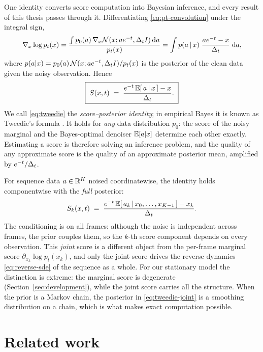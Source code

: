 One identity converts score computation into Bayesian inference, and every
result of this thesis passes through it. Differentiating
\eqref{eq:pt-convolution} under the integral sign,
\begin{equation*}
  \nabla_x \log p_t(x)
  = \frac{\int p_0(a)\, \nabla_x \mathcal{N}(x; a e^{-t}, \Delta_t I)\, \mathrm{d} a}{p_t(x)}
  = \int p(a \,|\, x)\;
    \frac{a e^{-t} - x}{\Delta_t}\; \mathrm{d} a ,
\end{equation*}
where $p(a|x) = p_0(a)\,\mathcal{N}(x; ae^{-t}, \Delta_t I)/p_t(x)$ is the posterior
of the clean data given the noisy observation. Hence
\begin{equation}
  \boxed{\;
  S(x, t)
  \;=\; \frac{e^{-t}\,\mathbb{E}[\,a \,|\, x\,] - x}{\Delta_t} .
  \;}
  \label{eq:tweedie}
\end{equation}
We call \eqref{eq:tweedie} the \emph{score--posterior identity}; in
empirical Bayes it is known as Tweedie's formula
\citep{robbins1956empirical, miyasawa1961empirical, efron2011tweedie}. It
holds for \emph{any} data distribution $p_0$: the score of the noisy
marginal and the Bayes-optimal denoiser $\mathbb{E}[a|x]$ determine each other
exactly. Estimating a score is therefore solving an inference problem, and
the quality of any approximate score is the quality of an approximate
posterior mean, amplified by $e^{-t}/\Delta_t$.

For sequence data $a \in \mathbb{R}^K$ noised coordinatewise, the identity holds
componentwise with the \emph{full} posterior:
\begin{equation}
  S_k(x, t)
  \;=\; \frac{e^{-t}\, \mathbb{E}[\,a_k \,|\, x_0, \dots, x_{K-1}\,] - x_k}{\Delta_t} .
  \label{eq:tweedie-joint}
\end{equation}
The conditioning is on all frames: although the noise is independent across
frames, the prior couples them, so the $k$-th score component depends on
every observation. This \emph{joint} score is a different object from the
per-frame marginal score $\partial_{x_k}\log p_t(x_k)$, and only the joint
score drives the reverse dynamics \eqref{eq:reverse-sde} of the sequence as
a whole. For our stationary model the distinction is extreme: the marginal
score is degenerate (Section~\ref{sec:development}), while the joint score
carries all the structure. When the prior is a Markov chain, the posterior
in \eqref{eq:tweedie-joint} is a smoothing distribution on a chain, which
is what makes exact computation possible.

\section{Related work}\label{sec:related}\label{sec:cascade}\label{sec:gap}

